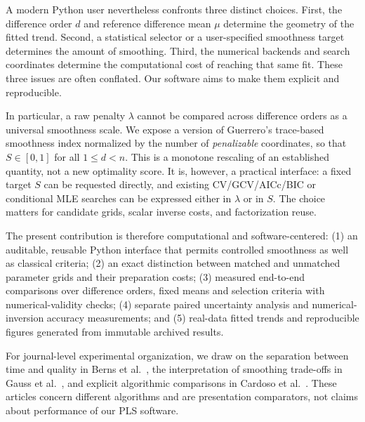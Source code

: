 \documentclass[pdflatex,sn-mathphys-ay]{sn-jnl}
\begin{document}
A modern Python user nevertheless confronts three distinct choices.
First, the difference order $d$ and reference difference mean
$\mu$ determine the geometry of the fitted trend. Second,
a statistical selector or a user-specified smoothness target
determines the amount of smoothing. Third, the numerical
backends and search coordinates determine the computational
cost of reaching that same fit. These three issues are
often conflated. Our software aims to make them explicit
and reproducible.

In particular, a raw penalty $\lambda$ cannot be compared across
difference orders as a universal smoothness scale. We expose
a version of Guerrero's trace-based smoothness index normalized
by the number of \emph{penalizable} coordinates, so that
$S\in[0,1]$ for all $1\le d<n$. This is a monotone rescaling
of an established quantity, not a new optimality score.
It is, however, a practical interface: a fixed target
$S$ can be requested directly, and existing CV/GCV/AICc/BIC
or conditional MLE searches can be expressed either in
$\lambda$ or in $S$. The choice matters for candidate
grids, scalar inverse costs, and factorization reuse.

The present contribution is therefore computational and
software-centered: (1) an auditable, reusable Python interface
that permits controlled smoothness as well as classical
criteria; (2) an exact distinction between matched and
unmatched parameter grids and their preparation costs;
(3) measured end-to-end comparisons over difference
orders, fixed means and selection criteria with
numerical-validity checks; (4) separate paired uncertainty
analysis and numerical-inversion accuracy measurements; and
(5) real-data fitted trends and reproducible figures
generated from immutable archived results.

For journal-level experimental organization, we draw on
the separation between time and quality in Berns et al.\
\cite{berns2022automated}, the interpretation of smoothing
trade-offs in Gauss et al.\ \cite{gauss2021skeleton}, and
explicit algorithmic comparisons in Cardoso et al.\
\cite{cardoso2025novelty}. These articles concern
different algorithms and are presentation comparators,
not claims about performance of our PLS software.






\end{document}
